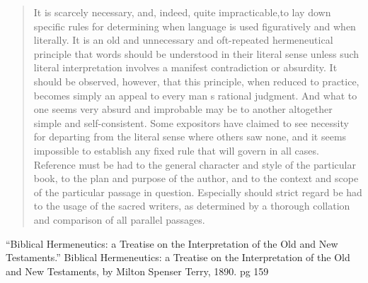 \documentclass[11pt]{article}
\begin{document}
\begin{thebibliography}{37}
\begin{quote}
It is scarcely necessary, and, indeed, quite impracticable,to lay down specific rules for determining when language is used figuratively and when literally. It is an old and unnecessary and oft-repeated hermeneutical principle that words should be understood in their literal sense unless such literal interpretation involves a manifest contradiction or absurdity.
It should be observed, however, that this principle, when reduced to practice,
becomes simply an appeal to every man s rational judgment. And
what to one seems very absurd and improbable may be to another
altogether simple and self-consistent. Some expositors have claimed
to see necessity for departing from the literal sense where others
saw none, and it seems impossible to establish any fixed rule that
will govern in all cases. Reference must be had to the general character and style of the particular book, to the plan and purpose of the author, and to the context and scope of the particular passage in question. Especially should strict regard be had to the usage of the sacred writers, as determined by a thorough collation and comparison of all parallel passages.
\end{quote}
“Biblical Hermeneutics: a Treatise on the Interpretation of the Old and New Testaments.” Biblical Hermeneutics: a Treatise on the Interpretation of the Old and New Testaments, by Milton Spenser Terry, 1890. pg 159


\end{thebibliography}
\end{document}
